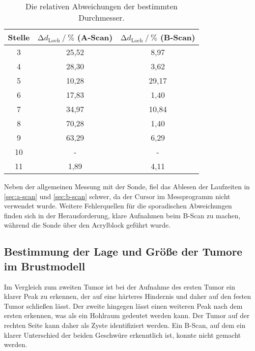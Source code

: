 \begin{table}
    \centering
    \caption{Die relativen Abweichungen der bestimmten Durchmesser.}
    \label{tab:abw}
    \begin{tabular}{c c c}
        \toprule
        Stelle &
        $\increment d_\text{Loch} \mathbin{/} \%$ (A-Scan) &
        $\increment d_\text{Loch} \mathbin{/} \%$ (B-Scan) \\
        \midrule
         3 &  25,52 &                   8,97 \\
         4 &  28,30 &                   3,62 \\
         5 &  10,28 &                  29,17 \\
         6 &  17,83 &                   1,40 \\
         7 &  34,97 &                  10,84 \\
         8 &  70,28 &                   1,40 \\
         9 &  63,29 &                   6,29 \\
         10 &     - &                     -  \\
         11 &  1,89 &                   4,11 \\
        \bottomrule
    \end{tabular} 
\end{table}

Neben der allgemeinen Messung mit der Sonde, fiel das Ablesen der Laufzeiten in \autoref{sec:a-scan} und \autoref{sec:b-scan} schwer,
da der Cursor im Messprogramm nicht verwendet wurde.  
Weitere Fehlerquellen für die sporadischen Abweichungen finden sich in der Herausforderung, klare Aufnahmen beim B-Scan zu machen, 
während die Sonde über den Acrylblock geführt wurde.


\subsection{Bestimmung der Lage und Größe der Tumore im Brustmodell}

Im Vergleich zum zweiten Tumor ist bei der Aufnahme des ersten Tumor ein klarer Peak zu erkennen, 
der auf eine härteres Hindernis und daher auf den festen Tumor schließen lässt.
Der zweite hingegen lässt einen weiteren Peak nach dem ersten erkennen, was als ein Hohlraum gedeutet werden kann.
Der Tumor auf der rechten Seite kann daher als Zyste identifiziert werden.
Ein B-Scan, auf dem ein klarer Unterschied der beiden Geschwüre erkenntlich ist, konnte nicht gemacht werden.